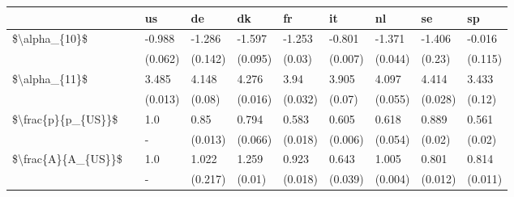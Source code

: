 \begin{tabular}{llllllllll}
\toprule
                   & {} &       us &       de &       dk &       fr &       it &       nl &       se &       sp \\
\midrule
\$\textbackslash alpha\_\{10\}\$ & {} &   -0.988 &   -1.286 &   -1.597 &   -1.253 &   -0.801 &   -1.371 &   -1.406 &   -0.016 \\
                   & {} &  (0.062) &  (0.142) &  (0.095) &   (0.03) &  (0.007) &  (0.044) &   (0.23) &  (0.115) \\
\$\textbackslash alpha\_\{11\}\$ & {} &    3.485 &    4.148 &    4.276 &     3.94 &    3.905 &    4.097 &    4.414 &    3.433 \\
                   & {} &  (0.013) &   (0.08) &  (0.016) &  (0.032) &   (0.07) &  (0.055) &  (0.028) &   (0.12) \\
\$\textbackslash frac\{p\}\{p\_\{US\}\}\$ & {} &      1.0 &     0.85 &    0.794 &    0.583 &    0.605 &    0.618 &    0.889 &    0.561 \\
                   & {} &        - &  (0.013) &  (0.066) &  (0.018) &  (0.006) &  (0.054) &   (0.02) &   (0.02) \\
\$\textbackslash frac\{A\}\{A\_\{US\}\}\$ & {} &      1.0 &    1.022 &    1.259 &    0.923 &    0.643 &    1.005 &    0.801 &    0.814 \\
                   & {} &        - &  (0.217) &   (0.01) &  (0.018) &  (0.039) &  (0.004) &  (0.012) &  (0.011) \\
\bottomrule
\end{tabular}
